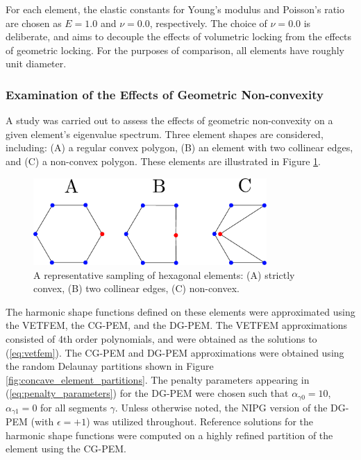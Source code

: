 For each element, the elastic constants for Young's modulus and Poisson's ratio are chosen as $E = 1.0$ and $\nu = 0.0$, respectively. The choice of $\nu = 0.0$ is deliberate, and aims to decouple the effects of volumetric locking from the effects of geometric locking. For the purposes of comparison, all elements have roughly unit diameter.

\subsubsection*{Examination of the Effects of Geometric Non-convexity}

A study was carried out to assess the effects of geometric non-convexity on a given element's eigenvalue spectrum. Three element shapes are considered, including: (A) a regular convex polygon, (B) an element with two collinear edges, and (C) a non-convex polygon. These elements are illustrated in Figure \ref{fig:concave_element_shapes}.

\begin{figure}[!h]
  \centering
  \includegraphics[width=3.5in]{figures/concave_element_shapes.pdf}  \caption{A representative sampling of hexagonal elements: (A) strictly convex, (B) two collinear edges, (C) non-convex.}
  \label{fig:concave_element_shapes}
\end{figure}

The harmonic shape functions defined on these elements were approximated using the VETFEM, the CG-PEM, and the DG-PEM. The VETFEM approximations consisted of 4th order polynomials, and were obtained as the solutions to (\ref{eq:vetfem}). The CG-PEM and DG-PEM approximations were obtained using the random Delaunay partitions shown in Figure \ref{fig:concave_element_partitions}. The penalty parameters appearing in (\ref{eq:penalty_parameters}) for the DG-PEM were chosen such that $\alpha_{\gamma0} = 10$, $\alpha_{\gamma1} = 0$ for all segments $\gamma$. Unless otherwise noted, the NIPG version of the DG-PEM (with $\epsilon = +1$) was utilized throughout. Reference solutions for the harmonic shape functions were computed on a highly refined partition of the element using the CG-PEM.

